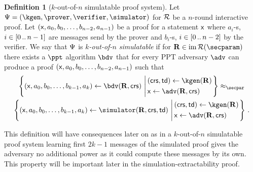 \documentclass[runningheads,11pt]{llncs}
\theoremstyle{definition}
\newtheorem{definition}[theorem]{Definition}
\begin{document}
{\begin{definition}[$k$-out-of-$n$ simulatable proof system]
	Let $\proofsystem = (\kgen, \prover, \verifier, \simulator)$ for $\mathcal{R}$ be
  a $n$-round  interactive proof. Let $(\mathsf{x}, a_0, b_0, \ldots, b_{n - 2}, a_{n - 1})$ be a proof for a statement $\mathsf{x}$ where $a_i$-s, $i \in [0 \, .. \, n - 1]$ are messages send by the prover and $b_i$-s, $i \in [0 \, .. \, n - 2]$ by the verifier.
	We say that $\mathrm{\Psi}$ is \emph{$k$-out-of-$n$ simulatable} if for  $\REL \in \image{\RELGEN(\secparam)}$ there exists a $\ppt$ algorithm $\bdv$ that for every PPT adversary $\adv$ can produce a proof $(\mathsf{x}, a_0, b_0, \ldots, b_{n - 2}, a_{n - 1})$ such that
	\begin{multline*}
		\left\{(\inp, a_0, b_0, \ldots, b_{k - 1}, a_{k}) \gets \bdv(\REL ,\crs) \,\left\vert\,
		\begin{aligned}
			 & (\crs, \td) \gets \kgen(\REL) \\
			 & \inp \gets \adv(\REL, \crs)
		\end{aligned}
		\right.
		\right\} \approx_\secpar \\
		\left\{(\inp, a_0, b_0, \ldots, b_{k - 1}, a_{k}) \gets \simulator(\REL, \crs, \td) \,\left\vert\,
		\begin{aligned}
			 & (\crs, \td) \gets \kgen(\REL) \\
			 & \inp \gets \adv(\REL, \crs)
		\end{aligned}
		\right.
		\right\}\,.
	\end{multline*}
\end{definition}

This definition will have consequences later on as in a $k$-out-of-$n$ simulatable proof system learning first $2k - 1$ messages of the simulated proof gives the adversary no additional power as it could compute these messages by its own.
This property will be important later in the simulation-extractability proof.
}
\end{document}
